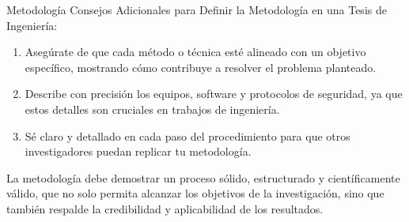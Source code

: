 \documentclass[9pt]{beamer}
\begin{document}
\begin{frame}{Metodología}
Consejos Adicionales para Definir la Metodología en una Tesis de Ingeniería:

\begin{enumerate}
    \item Asegúrate de que cada método o técnica esté alineado con un objetivo específico, mostrando cómo contribuye a resolver el problema planteado.
    \item Describe con precisión los equipos, software y protocolos de seguridad, ya que estos detalles son cruciales en trabajos de ingeniería.
    \item Sé claro y detallado en cada paso del procedimiento para que otros investigadores puedan replicar tu metodología.
\end{enumerate}

La metodología debe demostrar un proceso sólido, estructurado y científicamente válido, que no solo permita alcanzar los objetivos de la investigación, sino que también respalde la credibilidad y aplicabilidad de los resultados.
\end{frame}
\end{document}
